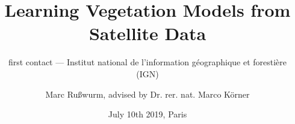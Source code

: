\documentclass[%
  aspectratio=169,
  9pt,
  USenglish,
  titlegraphic, %
  affiliationintitlepagehead,
  progressbar,
]{beamer}
\title{Learning Vegetation Models from Satellite Data}
\subtitle{first contact --- Institut national de l'information géographique et forestière (IGN)}
\author[M. Rußwurm]{Marc Rußwurm, advised by Dr. rer. nat. Marco Körner}
\institute[TUM]{Technical University of Munich, Germany\\
                Remote Sensing Technology}
\date{July 10th 2019, Paris}
\begin{document}
\begin{frame}[t]
  \titlepage
\end{frame}

%
%		
%		
\end{document}

